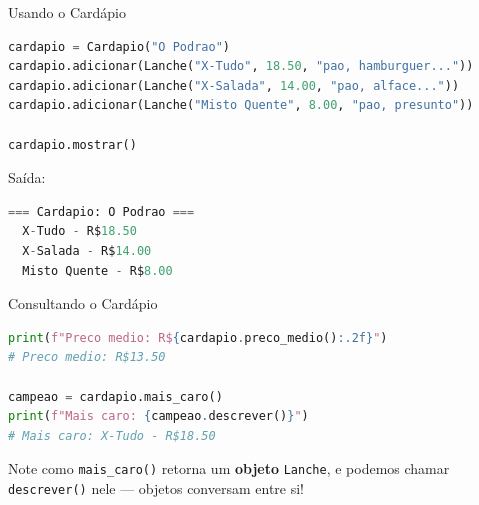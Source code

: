 \documentclass[aspectratio=169]{beamer}
\begin{document}
\begin{frame}[fragile]{Usando o Cardápio}
  \begin{lstlisting}[language=Python]
cardapio = Cardapio("O Podrao")
cardapio.adicionar(Lanche("X-Tudo", 18.50, "pao, hamburguer..."))
cardapio.adicionar(Lanche("X-Salada", 14.00, "pao, alface..."))
cardapio.adicionar(Lanche("Misto Quente", 8.00, "pao, presunto"))

cardapio.mostrar()
  \end{lstlisting}

  Saída:
  \begin{lstlisting}[language=Python, numbers=none]
=== Cardapio: O Podrao ===
  X-Tudo - R$18.50
  X-Salada - R$14.00
  Misto Quente - R$8.00
  \end{lstlisting}
\end{frame}

\begin{frame}[fragile]{Consultando o Cardápio}
  \begin{lstlisting}[language=Python]
print(f"Preco medio: R${cardapio.preco_medio():.2f}")
# Preco medio: R$13.50

campeao = cardapio.mais_caro()
print(f"Mais caro: {campeao.descrever()}")
# Mais caro: X-Tudo - R$18.50
  \end{lstlisting}

  \vspace{0.5cm}
  Note como \texttt{mais\_caro()} retorna um \textbf{objeto} \texttt{Lanche},
  e podemos chamar \texttt{descrever()} nele --- objetos conversam entre si!
\end{frame}
\end{document}
